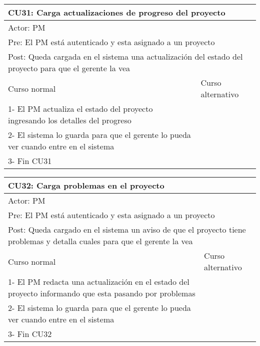 \begin{table}[H]
  \begin{adjustbox}{max width = \textwidth}
  \begin{tabular}{|l|l|}
    \hline
    \multicolumn{2}{|l|}{CU31: Carga actualizaciones de progreso del proyecto
} \\\hline
    \multicolumn{2}{|l|}{Actor: PM} \\\hline
    \multicolumn{2}{|l|}{Pre: El PM está autenticado y esta asignado a un proyecto} \\\hline
    \multicolumn{2}{|l|}{Post: Queda cargada en el sistema una actualización del estado del proyecto para que el gerente la vea} \\\hline
     Curso normal & Curso alternativo\\ \hline
	 1- El PM actualiza el estado del proyecto ingresando los detalles del progreso & \\ \hline
   2- El sistema lo guarda para que el gerente lo pueda ver cuando entre en el sistema & \\ \hline
   3- Fin CU31 & \\ \hline
  \end{tabular}
  \end{adjustbox}
\end{table}

\begin{table}[H]
  \begin{adjustbox}{max width = \textwidth}
  \begin{tabular}{|l|l|}
    \hline
    \multicolumn{2}{|l|}{CU32: Carga problemas en el proyecto
} \\\hline
    \multicolumn{2}{|l|}{Actor: PM} \\\hline
    \multicolumn{2}{|l|}{Pre: El PM está autenticado y esta asignado a un proyecto} \\\hline
    \multicolumn{2}{|l|}{Post: Queda cargado en el sistema un aviso de que el proyecto tiene problemas y detalla cuales para que el gerente la vea} \\\hline
     Curso normal & Curso alternativo\\ \hline
	 1- El PM redacta una actualización en el estado del proyecto informando que esta pasando por problemas & \\ \hline
   2- El sistema lo guarda para que el gerente lo pueda ver cuando entre en el sistema & \\ \hline
   3- Fin CU32 & \\ \hline
  \end{tabular}
  \end{adjustbox}
\end{table}

